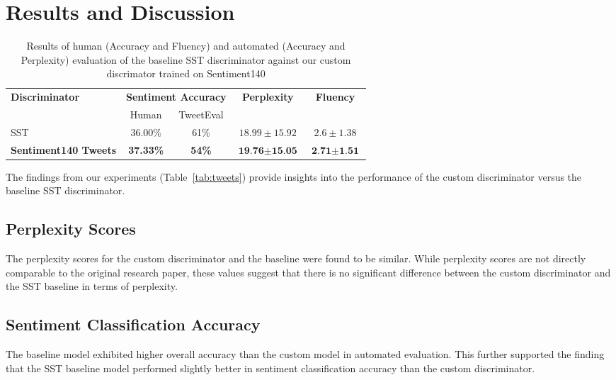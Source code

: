 \documentclass[11pt]{article}
\begin{document}
\section{Results and Discussion} 
\begin{table*}
\centering
\begin{tabular}{l|cccc}
\toprule
\textbf{Discriminator} & \multicolumn{2}{c}{\textbf{Sentiment Accuracy}} & \textbf{Perplexity} & \textbf{Fluency}\\
{} & {Human} & {TweetEval} & {} & {}\\
\midrule
{SST} & {36.00\%} & {61\%} & \begin{math}18.99\pm15.92\end{math} & \begin{math}2.6\pm1.38\end{math} \\
\textbf{Sentiment140 Tweets} & \textbf{37.33\%} & \textbf{54\%} & \begin{math}\textbf{19.76}\pm\textbf{15.05}\end{math} & \begin{math}\textbf{2.71}\pm\textbf{1.51}\end{math} \\
\bottomrule
\end{tabular}
\caption{Results of human (Accuracy and Fluency) and automated (Accuracy and Perplexity) evaluation of the baseline SST discriminator against our custom discrimator trained on Sentiment140}
\label{tab:results}
\end{table*}

The findings from our experiments (Table~\ref{tab:tweets}) provide insights into the performance of the custom discriminator versus the baseline SST discriminator.

\subsection{Perplexity Scores} 
The perplexity scores for the custom discriminator and the baseline were found to be similar. While perplexity scores are not directly comparable to the original research paper, these values suggest that there is no significant difference between the custom discriminator and the SST baseline in terms of perplexity.

\subsection{Sentiment Classification Accuracy}
The baseline model exhibited higher overall accuracy than the custom model in automated evaluation. This further supported the finding that the SST baseline model performed slightly better in sentiment classification accuracy than the custom discriminator.
\end{document}
